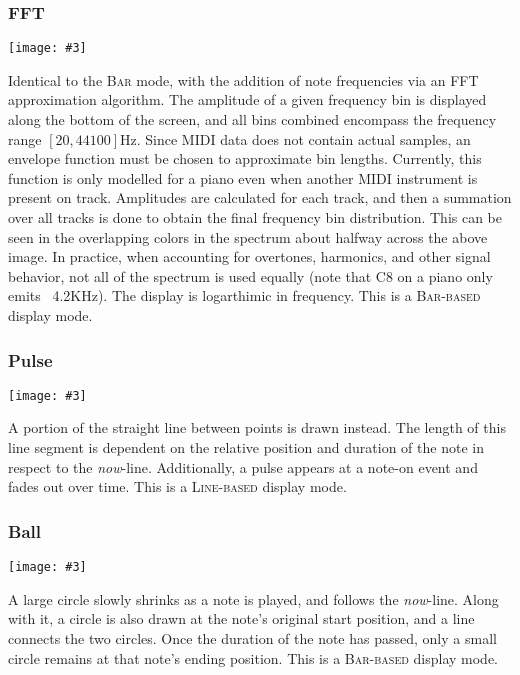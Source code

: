 \documentclass[english]{article}
\makeatletter
\newenvironment{restoretext}%
    {\@parboxrestore%
     \begin{adjustwidth}{}{\leftmargin}%
    }{\end{adjustwidth}
     }
\def\rcbegin{\begin{restoretext}\centering}
\def\rcend{\end{restoretext}}
\newcommand{\rcgnc}[3][]{
  \rcbegin
    \texttt{[image: \#3]}
  \rcend
  \vspace{1em}
}
\makeatother
\begin{document}
\subsubsection{FFT}

\rcgnc{0.86}{image/fft.png}

Identical to the \textsc{Bar} mode, with the addition of note frequencies via 
an FFT approximation algorithm. The amplitude of a given frequency bin is
displayed along the bottom of the screen, and all bins combined encompass the
frequency range $[20, 44100]$Hz.
Since MIDI data does not contain actual samples, an envelope function
must be chosen to approximate bin lengths. Currently, this function
is only modelled for a piano even when another MIDI instrument is present on track. Amplitudes are calculated
for each track, and then a summation over all tracks is done to obtain the final frequency bin distribution.
This can be seen in the overlapping colors in the spectrum about halfway across the above image. In practice, 
when accounting for overtones, harmonics, and other signal behavior, not all of the spectrum is used equally
(note that C8 on a piano only emits ~4.2KHz). The display is logarthimic in frequency. 
This is a \textsc{Bar-based} display mode.

\newpage
\subsubsection{Pulse}

\rcgnc{0.86}{image/pulse.png}

A portion of the straight line between points is drawn instead. The length of this
line segment is dependent on the relative position and duration of the note in respect to the \textit{now}-line.
Additionally, a pulse appears at a note-on event and fades out over time.
This is a \textsc{Line-based} display mode.


\subsubsection{Ball}

\rcgnc{0.86}{image/ball.png}

A large circle slowly shrinks as a note is played, and follows the \textit{now}-line. Along with it, a 
circle is also drawn at the note's original start position, and a line connects the two circles. Once the duration
of the note has passed, only a small circle remains at that note's ending position.
This is a \textsc{Bar-based} display mode.
\end{document}
